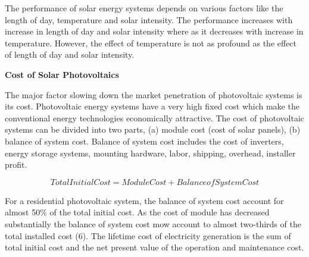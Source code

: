 \documentclass[12pt]{article}
\begin{document}
\begin{table}[H]
\begin{tabular}{p{0.94in}p{1.81in}p{0.81in}p{2.19in}}
\end{tabular}
 \end{table}




\vspace{\baselineskip}
\begin{justify}
The performance of solar energy systems depends on various factors like the length of day, temperature and solar intensity. The performance increases with increase in length of day and solar intensity where as it decreases with increase in temperature. However, the effect of temperature is not as profound as the effect of length of day and solar intensity.
\end{justify}\par


\vspace{\baselineskip}



\newpage

\vspace{\baselineskip}\begin{justify}
\textbf{Cost of Solar Photovoltaics}
\end{justify}\par


\vspace{\baselineskip}
\begin{justify}
The major factor slowing down the market penetration of photovoltaic systems is its cost. Photovoltaic energy systems have a very high fixed cost which make the conventional energy technologies economically attractive. The cost of photovoltaic systems can be divided into two parts, (a) module cost (cost of solar panels), (b) balance of system cost. Balance of system cost includes the cost of inverters, energy storage systems, mounting hardware, labor, shipping, overhead, installer profit. 
\end{justify}\par

\begin{justify}
 \[ Total Initial Cost=Module Cost+Balance of System Cost \] 
\end{justify}\par

\begin{justify}
For a residential photovoltaic system, the balance of system cost account for almost 50$\%$  of the total initial cost. As the cost of module has decreased substantially the balance of system cost mow account to almost two-thirds of the total installed cost (6). The lifetime cost of electricity generation is the sum of total initial cost and the net present value of the operation and maintenance cost.
\end{justify}\par
\end{document}
